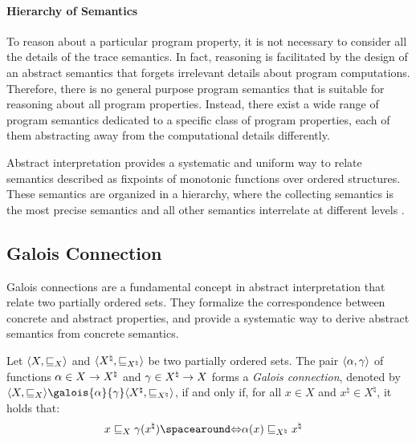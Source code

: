 \paragraph{Hierarchy of Semantics}

To reason about a particular program property, it is not necessary to consider all the details of the trace semantics.
In fact, reasoning is facilitated by the design of an abstract semantics that forgets irrelevant details about program computations.
Therefore, there is no general purpose program semantics that is suitable for reasoning about all program properties.
Instead, there exist a wide range of program semantics dedicated to a specific class of program properties, each of them abstracting away from the computational details differently.

Abstract interpretation provides a systematic and uniform way to relate semantics described as fixpoints of monotonic functions over ordered structures.
These semantics are organized in a hierarchy, where the collecting semantics is the most precise semantics and all other semantics interrelate at different levels .



\subsection{Galois Connection}

Galois connections are a fundamental concept in abstract interpretation that relate two partially ordered sets.
They formalize the correspondence between concrete and abstract properties, and provide a systematic way to derive abstract semantics from concrete semantics.

\begin{definition}
  Let $\langle X, \sqsubseteq_X \rangle$ and $\langle {X^\natural}, \sqsubseteq_{X^\natural} \rangle$ be two partially ordered sets.
  The pair $\langle \alpha, \gamma \rangle$ of functions $\alpha\in X \to {X^\natural}$ and $\gamma\in {X^\natural} \to X$ forms a \emph{Galois connection}, denoted by $\tuple{X}{\sqsubseteq_X}\galois{\abstraction}{\concretization}\tuple{{X^\natural}}{\sqsubseteq_{X^\natural}}$, if and only if, for all $x\in X$ and ${x^\natural}\in {X^\natural}$, it holds that:
  \begin{align*}
    x \sqsubseteq_X \concretization({x^\natural}) &\IfF \abstraction(x) \sqsubseteq_{X^\natural} {x^\natural}
  \end{align*}
\end{definition}

